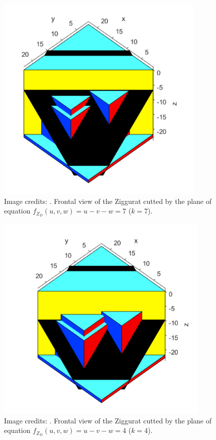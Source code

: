 \documentclass[english, LaM, oneside, noexaminfo]{sapthesis}
\begin{document}
\begin{figure}[tb]
\centering
\includegraphics[height=10cm]{Ziggurat 3D k=7.png}
\caption{Image credits: \cite{student01_my_bachel}. Frontal view of the Ziggurat cutted by the plane of equation $f_{Z_D}(u,v,w) = u-v-w = 7$ ($k=7$).}\label{fig:Ziggurat 3D k=7}
\end{figure}

\begin{figure}[tb]
\centering
\includegraphics[height=10cm]{Ziggurat 3D k=10.png}
\caption{Image credits: \cite{student01_my_bachel}. Frontal view of the Ziggurat cutted by the plane of equation $f_{Z_D}(u,v,w) = u - v - w = 4$ ($k=4$).}\label{fig:Ziggurat 3D k=10}
\end{figure}
\end{document}
